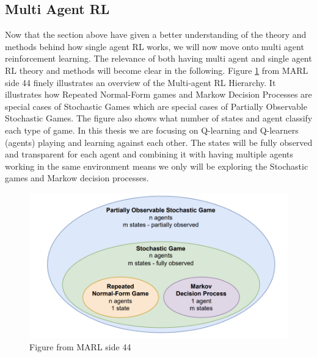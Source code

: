 \documentclass{article}
\begin{document}
\subsection{Multi Agent RL}
Now that the section above have given a better understanding of the theory and methods behind how single agent RL works, we will now move onto multi agent reinforcement learning. The relevance of both having multi agent and single agent RL theory and methods will become clear in the following. Figure \ref{fig:marside44} from MARL side 44 finely illustrates an overview of the Multi-agent RL Hierarchy. It illustrates how Repeated Normal-Form games and Markow Decision Processes are special cases of Stochastic Games which are special cases of Partially Observable Stochastic Games. The figure also shows what number of states and agent classify each type of game. In this thesis we are focusing on Q-learning and Q-learners (agents) playing and learning against each other. The states will be fully observed and transparent for each agent and combining it with having multiple agents working in the same environment means we only will be exploring the Stochastic games and Markow decision processes.
\begin{figure}[H]
    \centering
    \includegraphics[width=0.5\linewidth]{Multi-agent-figure.png}
    \caption{Figure from MARL side 44 }
    \label{fig:marside44}
\end{figure}
\end{document}
